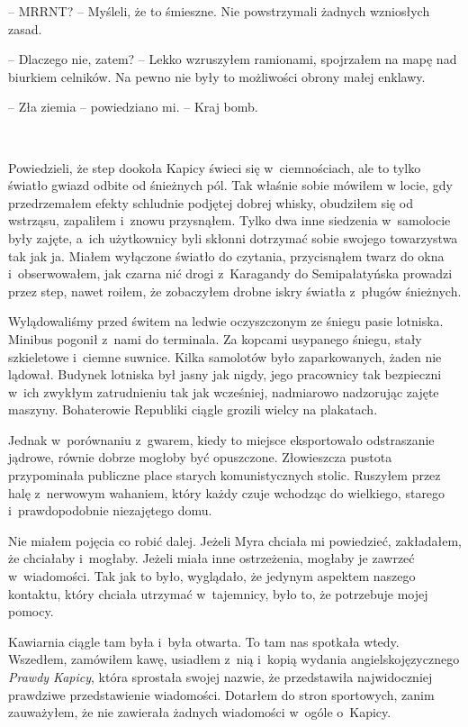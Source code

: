 \documentclass[oneside,polish,11pt,sfheadings]{mwbk}
\begin{document}
-- MRRNT? -- Myśleli, że to śmieszne. Nie powstrzymali żadnych wzniosłych
zasad.

-- Dlaczego nie, zatem? -- Lekko wzruszyłem ramionami, spojrzałem na mapę
nad biurkiem celników. Na pewno nie były to możliwości obrony małej
enklawy.

-- Zła ziemia -- powiedziano mi. -- Kraj bomb.

~

Powiedzieli, że step dookoła Kapicy świeci się w~ciemnościach, ale to
tylko światło gwiazd odbite od śnieżnych pól. Tak właśnie sobie mówiłem
w locie, gdy przedrzemałem efekty schludnie podjętej dobrej whisky,
obudziłem się od wstrząsu, zapaliłem i~znowu przysnąłem. Tylko dwa inne
siedzenia w~samolocie były zajęte, a~ich użytkownicy byli skłonni
dotrzymać sobie swojego towarzystwa tak jak ja. Miałem wyłączone światło do
czytania, przycisnąłem twarz do okna i~obserwowałem, jak czarna nić
drogi z~Karagandy do Semipałatyńska prowadzi przez step, nawet roiłem,
że zobaczyłem drobne iskry światła z~pługów śnieżnych.

Wylądowaliśmy przed świtem na ledwie oczyszczonym ze śniegu pasie
lotniska. Minibus pogonił z~nami do terminala. Za kopcami usypanego
śniegu, stały szkieletowe i~ciemne suwnice. Kilka samolotów było
zaparkowanych, żaden nie lądował. Budynek lotniska był jasny jak nigdy,
jego pracownicy tak bezpieczni w~ich zwykłym zatrudnieniu tak jak
wcześniej, nadmiarowo nadzorując zajęte maszyny. Bohaterowie Republiki
ciągle grozili wielcy na plakatach.

Jednak w~porównaniu z~gwarem, kiedy to miejsce eksportowało odstraszanie
jądrowe, równie dobrze mogłoby być opuszczone. Złowieszcza pustota
przypominała publiczne place starych komunistycznych stolic. Ruszyłem
przez halę z~nerwowym wahaniem, który każdy czuje wchodząc do wielkiego,
starego i~prawdopodobnie niezajętego domu.

Nie miałem pojęcia co robić dalej. Jeżeli Myra chciała mi powiedzieć,
zakładałem, że chciałaby i~mogłaby. Jeżeli miała inne ostrzeżenia,
mogłaby je zawrzeć w~wiadomości. Tak jak to było, wyglądało, że jedynym
aspektem naszego kontaktu, który chciała utrzymać w~tajemnicy, było to,
że potrzebuje mojej pomocy.

Kawiarnia ciągle tam była i~była otwarta. To tam nas spotkała wtedy.
Wszedłem, zamówiłem kawę, usiadłem z~nią i~kopią wydania
angielskojęzycznego \emph{Prawdy Kapicy}, która sprostała swojej nazwie,
że przedstawiła najwidoczniej prawdziwe przedstawienie wiadomości.
Dotarłem do stron sportowych, zanim zauważyłem, że nie zawierała żadnych
wiadomości w~ogóle o~Kapicy.
\end{document}
